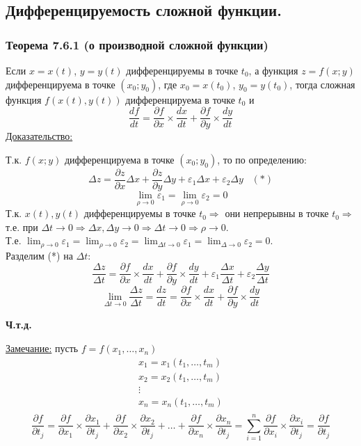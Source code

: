 \documentclass[12pt]{article}
\begin{document}
    \subsection{Дифференцируемость сложной функции.}
    \subsubsection*{Теорема 7.6.1 (о производной сложной функции)}\label{th:7.6.1}
    Если $x = x(t)$, $y = y(t)$ дифференцируемы в точке $t_0$, а функция $z = f(x;y)$ дифференцируема в точке $(x_0; y_0)$, где $x_0 = x(t_0)$, $y_0 = y(t_0)$, тогда сложная функция $f(x(t), y(t))$ дифференцируема в точке $t_0$ и 
    \[ \frac{df}{dt} = \frac{\partial f}{\partial x} \times \frac{dx}{dt} + \frac{\partial f}{\partial y} \times \frac{dy}{dt} \]
    \underline{Доказательство:}
    \begin{adjustwidth}{1.5em}{1.5em}
        Т.к. $f(x;y)$ дифференцируема в точке $(x_0; y_0)$, то по определению:
        \[ \Delta z = \frac{\partial z}{\partial x} \Delta x + \frac{\partial z}{\partial y} \Delta y + \varepsilon_1 \Delta x + \varepsilon_2 \Delta y \,\,\,\,\, (*) \]
        \[ \lim_{\rho \to 0} \varepsilon_1 = \lim_{\rho \to 0} \varepsilon_2 = 0 \]
        Т.к. $x(t), y(t)$ дифференцируемы в точке $t_0 \Rightarrow$ они непрерывны в точке $t_0 \Rightarrow$ т.е. при $\Delta t \to 0 \Rightarrow \Delta x, \Delta y \to 0 \Rightarrow \Delta t \to 0 \Rightarrow \rho \to 0$.\\
        Т.е. $\lim_{\rho \to 0} \varepsilon_1 = \lim_{\rho \to 0}\varepsilon_2 = \lim_{\Delta t \to 0} \varepsilon_1 = \lim_{\Delta \to 0}\varepsilon_2 = 0$.\\
        Разделим (*) на $\Delta t$:
        \[ \frac{\Delta z}{\Delta t} = \frac{\partial f}{\partial x} \times \frac{dx}{dt} + \frac{\partial f}{\partial y} \times \frac{dy}{dt} + \varepsilon_1 \frac{\Delta x}{\Delta t} + \varepsilon_2 \frac{\Delta y}{\Delta t} \]
        \[ \lim_{\Delta t \to 0} \frac{\Delta z}{\Delta t} = \frac{dz}{dt} = \frac{\partial f}{\partial x} \times \frac{dx}{dt} + \frac{\partial f}{\partial y} \times \frac{dy}{dt} \]
        \begin{center}
            \textbf{Ч.т.д.}
        \end{center}
    \end{adjustwidth}
    \underline{Замечание:} пусть $f = f(x_1, \dots, x_n)$
    \begin{gather*}
        x_1 = x_1(t_1, \dots, t_m)\\
        x_2 = x_2(t_1, \dots, t_m)\\
        \vdots\\
        x_n = x_n(t_1, \dots, t_m)\\
    \end{gather*}
    \[ \frac{\partial f}{\partial t_j} = \frac{\partial f}{\partial x_1} \times \frac{\partial x_1}{\partial t_j} + \frac{\partial f}{\partial x_2} \times \frac{\partial x_2}{\partial t_j} + \dots + \frac{\partial f}{\partial x_n} \times \frac{\partial x_n}{\partial t_j} = \sum_{i=1}^{n} \frac{\partial f}{\partial x_i} \times \frac{\partial x_i}{\partial t_j} = \frac{\partial f}{\partial t_j} \]
\end{document}
